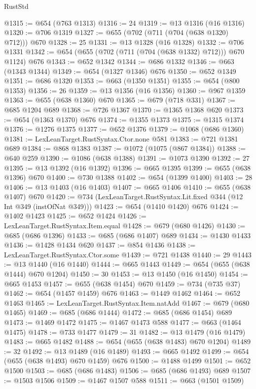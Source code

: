 \begin{lexlean}{RustStd}
\begin{coremodule}
{\begin{coremodule}
{{{{{{{{{{{{{{{@1315 := @654 (@763 @1313)
@1316 := 24
@1319 := @13 @1316 (@16 @1316)
@1320 := @706 @1319
@1327 := @655 (@702 (@711 (@704 (@638 @1320) @712))) @670
@1328 := 25
@1331 := @13 @1328 (@16 @1328)
@1332 := @706 @1331
@1342 := @654 (@655 (@702 (@711 (@704 (@638 @1332) @712))) @670 @1124) @676
@1343 := @652 @1342
@1344 := @686 @1332
@1346 := @663 (@1343 @1344)
@1349 := @654 (@1327 @1346) @676
@1350 := @652 @1349
@1351 := @686 @1320
@1353 := @663 (@1350 @1351)
@1355 := @654 (@800 @1353)
@1356 := 26
@1359 := @13 @1356 (@16 @1356)
@1360 := @967 @1359
@1363 := @655 (@638 @1360) @670
@1365 := @679 (@718 @331)
@1367 := @685 @1204 @689
@1368 := @726 @1367
@1370 := @1365 @1368 @620
@1373 := @654 (@1363 @1370) @676
@1374 := @1355 @1373
@1375 := @1315 @1374
@1376 := @1276 @1375
@1377 := @652 @1376
@1379 := @1068 (@686 @1360)
@1381 := LexLeanTarget.RustSyntax.Ctor.none @581
@1383 := @721 @1381 @689
@1384 := @868 @1383
@1387 := @1072 (@1075 (@867 @1384))
@1388 := @640 @259
@1390 := @1086 (@638 @1388)
@1391 := @1073 @1390
@1392 := 27
@1395 := @13 @1392 (@16 @1392)
@1396 := @665 @1395
@1399 := @655 (@638 @1396) @670
@1400 := @730 @1388
@1402 := @654 (@1399 @1400)
@1403 := 28
@1406 := @13 @1403 (@16 @1403)
@1407 := @665 @1406
@1410 := @655 (@638 @1407) @670
@1420 := @734 (LexLeanTarget.RustSyntax.Lit.fixed @344 (@12 Int @349 (instOfNat @349)))
@1423 := @654 (@1410 @1420) @676
@1424 := @1402 @1423
@1425 := @652 @1424
@1426 := LexLeanTarget.RustSyntax.Item.equal
@1428 := @679 (@680 @1426)
@1430 := @685 (@686 @1396)
@1433 := @685 (@686 @1407) @689
@1434 := @1430 @1433
@1436 := @1428 @1434 @620
@1437 := @854 @1436
@1438 := LexLeanTarget.RustSyntax.Ctor.some
@1439 := @721 @1438
@1440 := 29
@1443 := @13 @1440 (@16 @1440)
@1444 := @665 @1443
@1449 := @654 (@655 (@638 @1444) @670 @1204)
@1450 := 30
@1453 := @13 @1450 (@16 @1450)
@1454 := @665 @1453
@1457 := @655 (@638 @1454) @670
@1459 := @734 (@735 @37)
@1462 := @654 (@1457 @1459) @676
@1463 := @1449 @1462
@1464 := @652 @1463
@1465 := LexLeanTarget.RustSyntax.Item.natAdd
@1467 := @679 (@680 @1465)
@1469 := @685 (@686 @1444)
@1472 := @685 (@686 @1454) @689
@1473 := @1469 @1472
@1475 := @1467 @1473 @588
@1477 := @663 (@1464 @1475)
@1478 := @733 @1477
@1479 := 31
@1482 := @13 @1479 (@16 @1479)
@1483 := @665 @1482
@1488 := @654 (@655 (@638 @1483) @670 @1204)
@1489 := 32
@1492 := @13 @1489 (@16 @1489)
@1493 := @665 @1492
@1499 := @654 (@655 (@638 @1493) @670 @1459) @676
@1500 := @1488 @1499
@1501 := @652 @1500
@1503 := @685 (@686 @1483)
@1506 := @685 (@686 @1493) @689
@1507 := @1503 @1506
@1509 := @1467 @1507 @588
@1511 := @663 (@1501 @1509)
}}}}}}}}}}}}}}}
\end{coremodule}}
\end{coremodule}
\end{lexlean}
